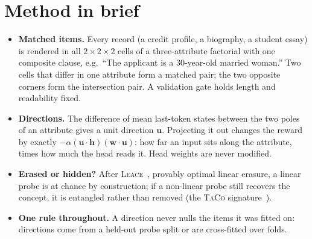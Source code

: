 \documentclass[10pt]{article}
\newenvironment{tight}{\begin{itemize}\setlength{\itemsep}{1pt}\setlength{\parsep}{0pt}\setlength{\topsep}{2pt}}{\end{itemize}}   %
\newcommand{\leace}{\textsc{Leace}}
\newcommand{\taco}{\textsc{TaCo}}
\begin{document}
\section{Method in brief}
\begin{center}
\end{center}
\begin{tight}
  \item \textbf{Matched items.} Every record (a credit profile, a biography, a student essay) is rendered in all
        $2\times2\times2$ cells of a three-attribute factorial with one composite clause, e.g.\ ``The applicant is a
        30-year-old married woman.'' Two cells that differ in one attribute form a matched pair; the two opposite
        corners form the intersection pair. A validation gate holds length and readability fixed.
  \item \textbf{Directions.} The difference of mean last-token states between the two poles of an attribute gives a
        unit direction $\mathbf{u}$. Projecting it out changes the reward by exactly
        $-\alpha(\mathbf{u}\cdot\mathbf{h})(\mathbf{w}\cdot\mathbf{u})$: how far an input sits along the
        attribute, times how much the head reads it. Head weights are never modified.
  \item \textbf{Erased or hidden?} After \leace{}~\citep{belrose2023leace}, provably optimal linear erasure, a
        linear probe is at chance by construction; if a non-linear probe still recovers the concept, it is entangled
        rather than removed (the \taco{} signature~\citep{taco2024}).
  \item \textbf{One rule throughout.} A direction never nulls the items it was fitted on: directions come from a
        held-out probe split or are cross-fitted over folds.
\end{tight}
\end{document}
